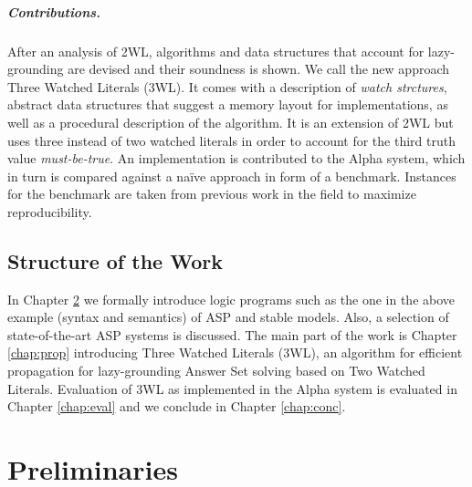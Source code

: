 \documentclass[final]{vutinfth} %
\newcommand{\mbt}{must-be-true\xspace}
\begin{document}


\paragraph{Contributions.} After an analysis of 2WL, algorithms and data structures that account for lazy-grounding are devised and their soundness is shown. We call the new approach Three Watched Literals (3WL). It comes with a description of \emph{watch strctures}, abstract data structures that suggest a memory layout for implementations, as well as a procedural description of the algorithm. It is an extension of 2WL but uses three instead of two watched literals in order to account for the third truth value \emph{\mbt}. An implementation is contributed to the Alpha system, which in turn is compared against a na{\"i}ve approach in form of a benchmark. Instances for the benchmark are taken from previous work in the field to maximize reproducibility.

\section{Structure of the Work}

In Chapter \ref{chap:prelim} we formally introduce logic programs such as the one in the above example (syntax and semantics) of ASP and stable models. Also, a selection of state-of-the-art ASP systems is discussed. The main part of the work is Chapter \ref{chap:prop} introducing Three Watched Literals (3WL), an algorithm for efficient propagation for lazy-grounding Answer Set solving based on Two Watched Literals. Evaluation of 3WL as implemented in the Alpha system is evaluated in Chapter \ref{chap:eval} and we conclude in Chapter \ref{chap:conc}.

\chapter{Preliminaries}
\label{chap:prelim}
\end{document}
